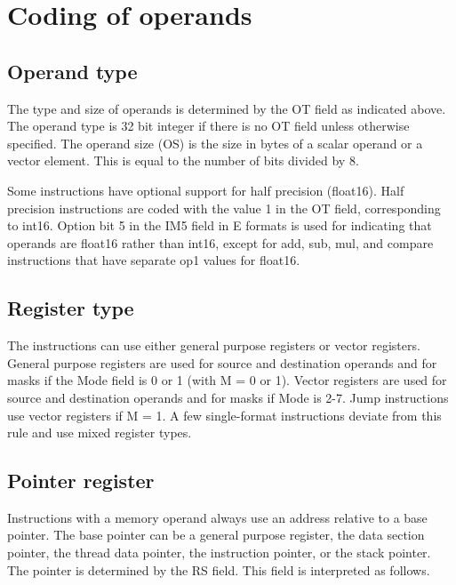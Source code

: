 \documentclass[forwardcom.tex]{subfiles}
\begin{document}

\vv
\section{Coding of operands}
\subsection{Operand type}
The type and size of operands is determined by the OT field as indicated above. The operand type is 32 bit integer if there is no OT field unless otherwise specified. The operand size (OS) is the size in bytes of a scalar operand or a vector element. This is equal to the number of bits divided by 8.
\vv

Some instructions have optional support for half precision (float16). Half precision instructions are coded with the value 1 in the OT field, corresponding to int16. Option bit 5 in the IM5 field in E formats is used for indicating that operands are float16 rather than int16, except for add, sub, mul, and compare instructions that have separate op1 values for float16.
\vv

\subsection{Register type}
The instructions can use either general purpose registers or vector registers. General purpose registers are used for source and destination operands and for masks if the Mode field is 0 or 1 (with M = 0 or 1). Vector registers are used for source and destination operands and for masks if Mode is 2-7. Jump instructions use vector registers if M = 1. A few single-format instructions deviate from this rule and use mixed register types.
\vv

\subsection{Pointer register}
Instructions with a memory operand always use an address relative to a base pointer. The base pointer can be a general purpose register, the data section pointer, the thread data pointer, the instruction pointer, or the stack pointer. The pointer is determined by the RS field. This field is interpreted as follows.
\vv
\end{document}
